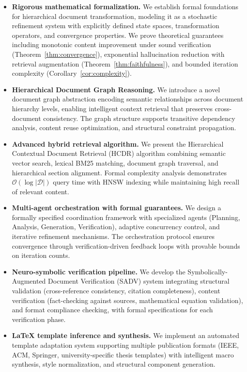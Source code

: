 \documentclass{ieeeaccess}
\begin{document}
\begin{itemize}
\item \textbf{Rigorous mathematical formalization.} We establish formal foundations for hierarchical document transformation, modeling it as a stochastic refinement system with explicitly defined state spaces, transformation operators, and convergence properties. We prove theoretical guarantees including monotonic content improvement under sound verification (Theorem~\ref{thm:convergence}), exponential hallucination reduction with retrieval augmentation (Theorem~\ref{thm:faithfulness}), and bounded iteration complexity (Corollary~\ref{cor:complexity}).

\item \textbf{Hierarchical Document Graph Reasoning.} We introduce a novel document graph abstraction encoding semantic relationships across document hierarchy levels, enabling intelligent context retrieval that preserves cross-document consistency. The graph structure supports transitive dependency analysis, content reuse optimization, and structural constraint propagation.

\item \textbf{Advanced hybrid retrieval algorithm.} We present the Hierarchical Contextual Document Retrieval (HCDR) algorithm combining semantic vector search, lexical BM25 matching, document graph traversal, and hierarchical section alignment. Formal complexity analysis demonstrates \(\mathcal{O}(\log |\mathcal{D}|)\) query time with HNSW indexing while maintaining high recall of relevant content.

\item \textbf{Multi-agent orchestration with formal guarantees.} We design a formally specified coordination framework with specialized agents (Planning, Analysis, Generation, Verification), adaptive concurrency control, and iterative refinement mechanisms. The orchestration protocol ensures convergence through verification-driven feedback loops with provable bounds on iteration counts.

\item \textbf{Neuro-symbolic verification pipeline.} We develop the Symbolically-Augmented Document Verification (SADV) system integrating structural validation (cross-reference consistency, citation completeness), content verification (fact-checking against sources, mathematical equation validation), and format compliance checking, with formal specifications for each verification phase.

\item \textbf{LaTeX template inference and synthesis.} We implement an automated template adaptation system supporting multiple publication formats (IEEE, ACM, Springer, university-specific thesis templates) with intelligent macro synthesis, style normalization, and structural component generation.


\end{itemize}
\end{document}
